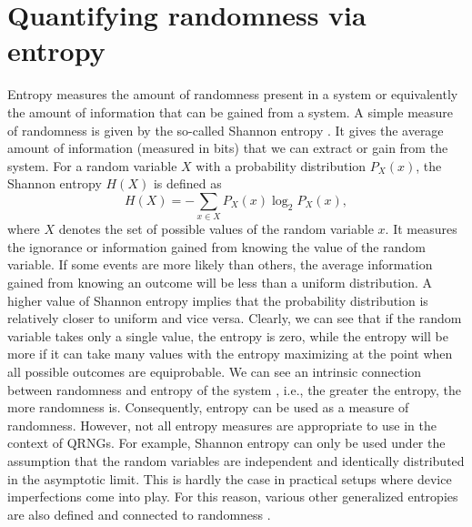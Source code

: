 \documentclass[]{interact}
\theoremstyle{plain}%
\theoremstyle{definition}
\theoremstyle{remark}
\begin{document}
\section{Quantifying randomness via entropy\label{sec:entropy}}
Entropy measures the amount of randomness present in a system or equivalently the amount of information that can be gained from a system. A simple measure of randomness is given by the so-called Shannon entropy \cite{shannon1948mathematical}. It gives the average amount of information (measured in bits) that we can extract or gain from the system. For a random variable $X$ with a probability distribution $P_X(x)$, the Shannon entropy $H(X)$ is defined as
$$
H(X)=- \sum_{x\in X}P_X(x)\log _2P_X(x),
$$
where $X$ denotes the set of possible values of the random variable $x$. It measures the ignorance or information gained from knowing the value of the random variable. If some events are more likely than others, the average information gained from knowing an outcome will be less than a uniform distribution. A higher value of Shannon entropy implies that the probability distribution is relatively closer to uniform and vice versa. Clearly, we can see that if the random variable takes only a single value, the entropy is zero, while the entropy will be more if it can take many values with the entropy maximizing at the point when all possible outcomes are equiprobable. We can see an intrinsic connection between randomness and entropy of the system \cite{bera2017randomness,yuan2015,yuan2019}, i.e., the greater the entropy, the more randomness is. Consequently, entropy can be used as a measure of randomness. However, not all entropy measures are appropriate to use in the context of QRNGs. For example, Shannon entropy can only be used under the assumption that the random variables are independent and identically distributed in the asymptotic limit. This is hardly the case in practical setups where device imperfections come into play. For this reason, various other generalized entropies are also defined and connected to randomness \cite{e20110813}. 
\end{document}
